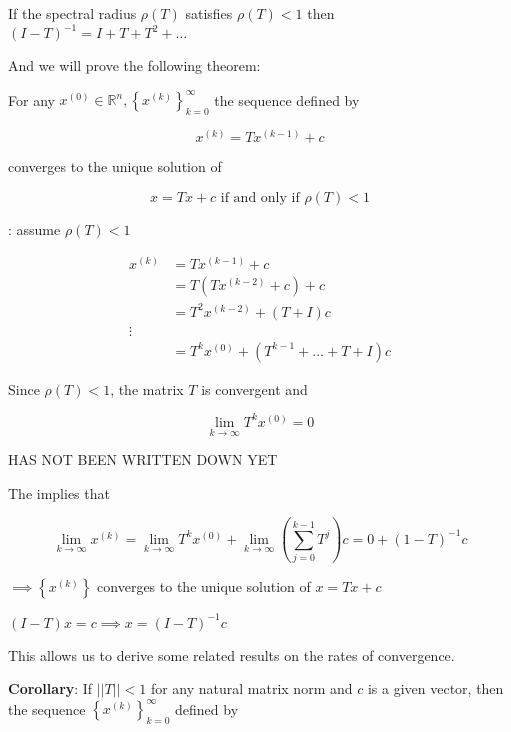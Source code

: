 \lemma If the spectral radius $\rho(T)$ satisfies $\rho(T) < 1$ then 
$(I-T)^{-1} = I + T + T^2 + \dots$

And we will prove the following theorem:

\thm For any $x^{(0)} \in \mathbb{R}^n, \left\{ x^{(k)} \right\}_{k=0}^\infty$
the sequence defined by 

\begin{equation*}
  x^{(k)} = Tx^{(k-1)} + c
\end{equation*}

converges to the unique solution of 

\begin{equation*}
  x = Tx + c \text{ if and only if }  \rho(T)<1
\end{equation*}

\bproof: assume $\rho(T)<1$

\begin{align*}
  x^{(k)} &= Tx^{(k-1)} + c \\
  &= T(Tx^{(k-2)} + c) + c \\
  &= T^2x^{(k-2)} + (T+I)c \\
  \vdots \\
  &= T^kx^{(0)} + (T^{k-1}+\dots+T+I)c 
\end{align*}

Since $\rho(T)<1$, the matrix $T$ is convergent and

\begin{equation*}
  \lim_{k \to \infty} T^kx^{(0)} = 0
\end{equation*}

\fproof

HAS NOT BEEN WRITTEN DOWN YET

The \lemma implies that 

\begin{equation*}
  \lim_{k \to \infty} x^{(k)} = \lim_{k \to \infty} T^kx^{(0)} + \lim_{k \to \infty} \left(\sum_{j=0}^{k-1} T^j \right)c = 0 + (1-T)^{-1}c
\end{equation*}

$\implies \left\{ x^{(k)} \right\}$ converges to the unique solution of $x=Tx+c$

\ie $(I-T)x = c \implies x = (I-T)^{-1}c$

This allows us to derive some related results on the rates of convergence.

\textbf{Corollary}: If $||T||<1$ for any natural matrix norm and $c$ is a given
vector, then the sequence $\left\{ x^{(k)} \right\}_{k=0}^\infty$ defined by

